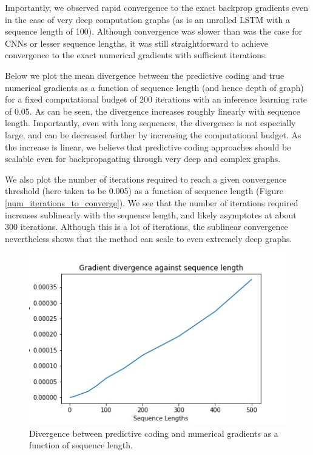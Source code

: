 Importantly, we observed rapid convergence to the exact backprop gradients even in the case of very deep computation graphs (as is an unrolled LSTM with a sequence length of 100). Although convergence was slower than was the case for CNNs or lesser sequence lengths, it was still straightforward to achieve convergence to the exact numerical gradients with sufficient iterations.

Below we plot the mean divergence between the predictive coding and true numerical gradients as a function of sequence length (and hence depth of graph) for a fixed computational budget of 200 iterations with an inference learning rate of 0.05. As can be seen, the divergence increases roughly linearly with sequence length. Importantly, even with long sequences, the divergence is not especially large, and can be decreased further by increasing the computational budget. As the increase is linear, we believe that predictive coding approaches should be scalable even for backpropagating through very deep and complex graphs.

We also plot the number of iterations required to reach a given convergence threshold (here taken to be 0.005) as a function of sequence length (Figure \ref{num_iterations_to_converge}). We see that the number of iterations required increases sublinearly with the sequence length, and likely asymptotes at about 300 iterations. Although this is a lot of iterations, the sublinear convergence nevertheless shows that the method can scale to even extremely deep graphs.

\begin{figure}[ht]
\label{sequence_length_effect}
  \centering
  \includegraphics[width=.9\linewidth]{chapter_6_figures/lstm_seqlen_divergences.jpg}  
\caption{Divergence between predictive coding and numerical gradients as a function of sequence length.}
\end{figure}

